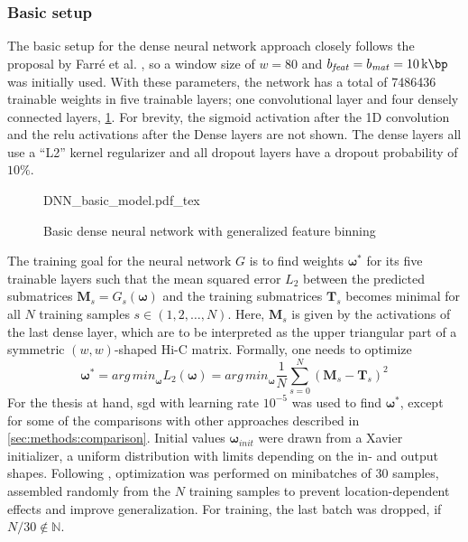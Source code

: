 \subsubsection{Basic setup} \label{sec:methods:basicSetup}
The basic setup for the dense neural network approach closely follows the proposal by Farr\'e et al. \cite{Farre2018a},
so a window size of $w=80$ and $b_\mathit{feat}=b_\mathit{mat} = \SI{10}{\kilo\bp}$ was initially used.
With these parameters, the network has a total of \SI{7486436}{} trainable weights in five trainable layers; 
one convolutional layer and four densely connected layers, \cref{fig:methods:basic_dnn}.
For brevity, the sigmoid activation after the 1D convolution and the \acrshort{relu} activations after the Dense layers are not shown.
The dense layers all use a ``L2'' kernel regularizer and all dropout layers have a dropout probability of $10\%$.
\begin{figure}[htb]
    \small
    \centering
    {DNN_basic_model.pdf_tex}
    \caption{Basic dense neural network with generalized feature binning}
    \label{fig:methods:basic_dnn}
\end{figure}

The training goal for the neural network $G$ is to find weights $\bm{\omega}^*$ for its five trainable layers 
such that the mean squared error $L_2$ between the predicted submatrices $\mathbf{M}_s = G_s(\bm{\omega})$ 
and the training submatrices $\mathbf{T}_s$ becomes minimal for all $N$ training samples $s \in (1,2,\dots, N)$. 
Here, $\mathbf{M}_s$ is given by the activations of the last dense layer, which are to be interpreted as the upper triangular 
part of a symmetric $(w, w)$-shaped Hi-C matrix.
Formally, one needs to optimize
\begin{equation}
 \bm{\omega}^* = \mathit{arg\,min}_{\bm{\omega}} L_2(\bm{\omega}) = 
        \mathit{arg\,min}_{\bm{\omega}} \frac{1}{N} \sum_{s=0}^N (\mathbf{M}_s - \mathbf{T}_s)^2 \label{eq:methods:nn-mse}
\end{equation} 
For the thesis at hand, \acrfull{sgd} with learning rate $10^{-5}$  was used to find $\bm{\omega}^*$,
except for some of the comparisons with other approaches described in \cref{sec:methods:comparison}.
Initial values $\bm{\omega}_\mathit{init}$ were drawn from a Xavier initializer, a uniform distribution with limits depending on the in- and output shapes.
Following \cite{Farre2018a}, optimization was performed on minibatches of 30 samples, assembled randomly from the $N$ training samples
to prevent location-dependent effects and improve generalization.
For training, the last batch was dropped, if $N/30 \not \in \mathbb{N}$. 

